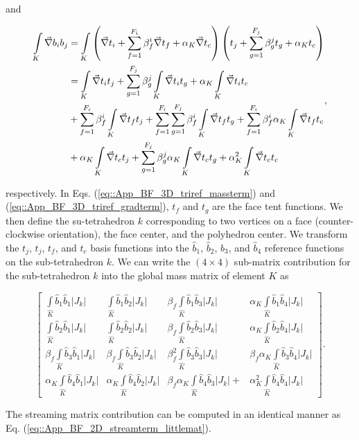\noindent and

\begin{equation}
\label{eq::App_BF_3D_triref_gradterm}
\begin{aligned}
\int\displaylimits_K\vec{\nabla} b_i b_j &= \int\displaylimits_K \left(\vec{\nabla} t_i +\sum_{f=1}^{F_i} \beta_f^i  \vec{\nabla}t_f + \alpha_K \vec{\nabla} t_c  \right) \left(  t_j+\sum_{g=1}^{F_j} \beta_g^j  t_g  + \alpha_K t_c \right) \\
&= \int\displaylimits_K\vec{\nabla} t_i t_j +\sum_{g=1}^{F_j} \beta_g^j  \int\displaylimits_K  \vec{\nabla} t_i t_g + \alpha_K \int\displaylimits_K  \vec{\nabla}t_i t_c  \\
&+  \sum_{f=1}^{F_i} \beta_f^i \int\displaylimits_K\vec{\nabla} t_f t_j   + \sum_{f=1}^{F_i} \sum_{g=1}^{F_j} \beta_f^i    \int\displaylimits_K  \vec{\nabla} t_f t_g+ \sum_{f=1}^{F_i} \beta_f^i \alpha_K \int\displaylimits_K \vec{\nabla} t_f t_c \\
&+  \alpha_K \int\displaylimits_K \vec{\nabla} t_c t_j + \sum_{g=1}^{F_j}\beta_g^j  \alpha_K  \int\displaylimits_K \vec{\nabla} t_c t_g   +  \alpha_K^2  \int\displaylimits_K \vec{\nabla} t_c t_c
\end{aligned},
\end{equation}

\noindent respectively. In Eqs. (\ref{eq::App_BF_3D_triref_massterm}) and (\ref{eq::App_BF_3D_triref_gradterm}), $t_f$ and $t_g$ are the face tent functions. We then define the su-tetrahedron $k$ corresponding to two vertices on a face (counter-clockwise orientation), the face center, and the polyhedron center. We transform the $t_j$, $t_j$, $t_f$, and $t_c$ basis functions into the $\hat{b}_1$, $\hat{b}_2$, $\hat{b}_3$, and $\hat{b}_4$ reference functions on the sub-tetrahedron $k$. We can write the $(4 \times 4)$ sub-matrix contribution for the sub-tetrahedron $k$ into the global mass matrix of element $K$ as

\begin{equation}
\label{eq::App_BF_3D_massterm_littlemat}
\left[
\begin{array}{cccc}
\int\limits_{\hat{K}} \hat{b}_1 \hat{b}_1 |J_k| & \int\limits_{\hat{K}} \hat{b}_1 \hat{b}_2 |J_k|& \beta_f \int\limits_{\hat{K}} \hat{b}_1 \hat{b}_3 |J_k| & \alpha_K \int\limits_{\hat{K}} \hat{b}_1 \hat{b}_4 |J_k| \\
\int\limits_{\hat{K}} \hat{b}_2 \hat{b}_1 |J_k| & \int\limits_{\hat{K}} \hat{b}_2 \hat{b}_2 |J_k| & \beta_f \int\limits_{\hat{K}} \hat{b}_2 \hat{b}_3 |J_k| & \alpha_K \int\limits_{\hat{K}} \hat{b}_2 \hat{b}_4 |J_k|  \\
\beta_f \int\limits_{\hat{K}} \hat{b}_3 \hat{b}_1 |J_k| &\beta_f  \int\limits_{\hat{K}} \hat{b}_3\hat{b}_2 |J_k| & \beta_f^2 \int\limits_{\hat{K}} \hat{b}_3 \hat{b}_3 |J_k| & \beta_f \alpha_K \int\limits_{\hat{K}} \hat{b}_3 \hat{b}_4 |J_k|  \\
\alpha_K \int\limits_{\hat{K}} \hat{b}_4 \hat{b}_1 |J_k| &\alpha_K  \int\limits_{\hat{K}} \hat{b}_4\hat{b}_2 |J_k| &  \beta_f \alpha_K \int\limits_{\hat{K}} \hat{b}_4 \hat{b}_3 |J_k| + & \alpha_K^2 \int\limits_{\hat{K}} \hat{b}_4 \hat{b}_4 |J_k| 
\end{array} \right] .
\end{equation}

\noindent The streaming matrix contribution can be computed in an identical manner as Eq. (\ref{eq::App_BF_2D_streamterm_littlemat}).

